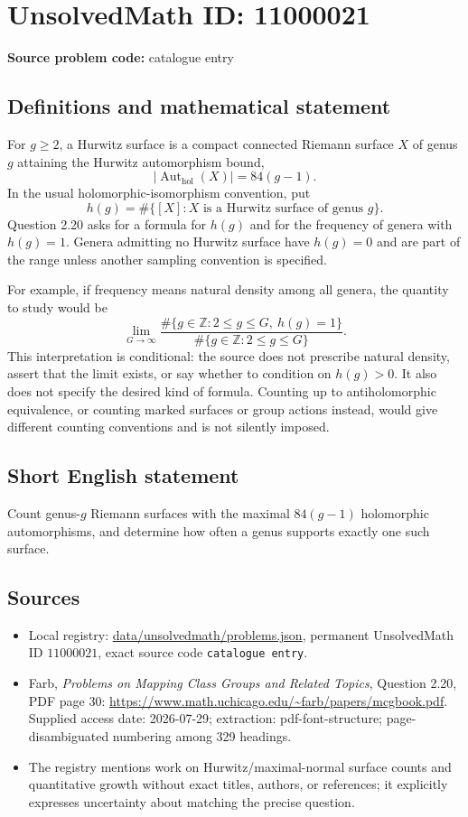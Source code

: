 \documentclass[11pt]{article}
\newcommand{\Z}{\mathbb{Z}}
\begin{document}
\section*{UnsolvedMath ID: 11000021}
\textbf{Source problem code:} catalogue entry
\subsection{Definitions and mathematical statement}
For $g\geq2$, a Hurwitz surface is a compact connected Riemann surface $X$ of genus $g$ attaining the Hurwitz automorphism bound,
\[
 |\operatorname{Aut}_{\mathrm{hol}}(X)|=84(g-1).
\]
In the usual holomorphic-isomorphism convention, put
\[
 h(g)=\#\{[X]:X\text{ is a Hurwitz surface of genus }g\}.
\]
Question 2.20 asks for a formula for $h(g)$ and for the frequency of genera with $h(g)=1$. Genera admitting no Hurwitz surface have $h(g)=0$ and are part of the range unless another sampling convention is specified.

For example, if frequency means natural density among all genera, the quantity to study would be
\[
 \lim_{G\to\infty}
 \frac{\#\{g\in\Z:2\leq g\leq G,\ h(g)=1\}}
 {\#\{g\in\Z:2\leq g\leq G\}}.
\]
This interpretation is conditional: the source does not prescribe natural density, assert that the limit exists, or say whether to condition on $h(g)>0$. It also does not specify the desired kind of formula. Counting up to antiholomorphic equivalence, or counting marked surfaces or group actions instead, would give different counting conventions and is not silently imposed.
\subsection{Short English statement}
Count genus-$g$ Riemann surfaces with the maximal $84(g-1)$ holomorphic automorphisms, and determine how often a genus supports exactly one such surface.
\subsection{Sources}
\begin{itemize}
\item Local registry: \url{data/unsolvedmath/problems.json}, permanent UnsolvedMath ID $11000021$, exact source code \texttt{catalogue entry}.
\item Farb, \emph{Problems on Mapping Class Groups and Related Topics}, Question 2.20, PDF page 30: \url{https://www.math.uchicago.edu/~farb/papers/mcgbook.pdf}. Supplied access date: 2026-07-29; extraction: pdf-font-structure; page-disambiguated numbering among 329 headings.
\item The registry mentions work on Hurwitz/maximal-normal surface counts and quantitative growth without exact titles, authors, or references; it explicitly expresses uncertainty about matching the precise question.
\end{itemize}
\end{document}
